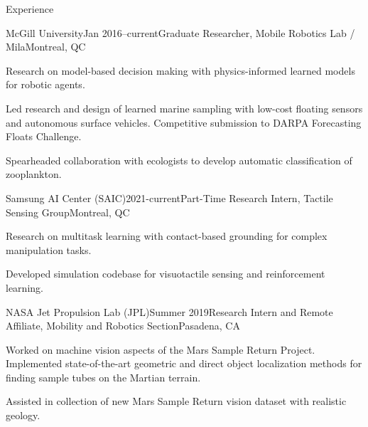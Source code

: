 \documentclass{resume} %
\begin{document}
\begin{rSection}{Experience}
\begin{rSubsection}{McGill University}{Jan 2016--current}{Graduate Researcher, Mobile Robotics Lab / Mila}{Montreal, QC}
\item{Research on model-based decision making with physics-informed learned models for robotic agents.}
\item{Led research and design of learned marine sampling with low-cost floating sensors and autonomous surface vehicles. Competitive submission to DARPA Forecasting Floats Challenge.}
\item{Spearheaded collaboration with ecologists to develop automatic classification of zooplankton.}
\end{rSubsection}
	\vspace{-.2cm}
	\begin{rSubsection}{Samsung AI Center (SAIC)}{2021-current}{Part-Time Research Intern, Tactile Sensing Group}{Montreal, QC}
\item{Research on multitask learning with contact-based grounding for complex manipulation tasks. }
\item{Developed simulation codebase for visuotactile sensing and reinforcement learning. }
\end{rSubsection}
	\vspace{-.2cm}
\begin{rSubsection}{NASA Jet Propulsion Lab (JPL)}{Summer 2019}{Research Intern and Remote Affiliate, Mobility and Robotics Section}{Pasadena, CA}
\item{Worked on machine vision aspects of the Mars Sample Return Project. Implemented state-of-the-art geometric and direct object localization methods for finding sample tubes on the Martian terrain.}
\item{Assisted in collection of new Mars Sample Return vision dataset with realistic geology.}
\end{rSubsection}
	\vspace{-.2cm}

\end{rSection}
\end{document}
